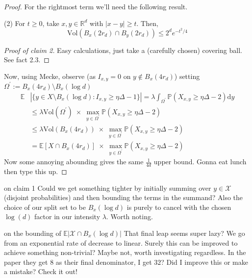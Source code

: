 \documentclass{article}
\begin{document}
\begin{proof}
    For the rightmost term we'll need the following result. 
    \begin{claim}[]{(2)}
        For $t \geq 0$, take $x, y \in \mathbb{R}^d$ with $\lvert x - y \rvert \geq t$. Then,
        \[\text{Vol}(B_x(2r_d)\cap B_y(2r_d)) \leq 2^d e^{-t^2/4}\]
    \end{claim}
    \begin{proof}[Proof of claim 2]
        Easy calculations, just take a (carefully chosen) covering ball. See \cite{campos2023} fact 2.3.
    \end{proof}
    Now, using Mecke, observe (as $I_{x,y} = 0$ on $y \notin B_{x}(4r_d)$) setting $\Omega^\prime 
    := B_x(4r_d) \setminus B_x(\log d)$
    \begin{align*}
        \mathbb{E}&|\{y \in X \setminus B_x(\log d) : I_{x,y} \geq \eta \Delta - 1\}| 
        = \lambda \int_{\Omega^\prime}\mathbb{P}(X_{x,y} \geq \eta \Delta - 2)\mathrm{d}y \\
        &\leq \lambda \text{Vol}(\Omega^\prime) \; \times \;\max_{y \in \Omega^\prime}\mathbb{P}(X_{x,y} \geq \eta \Delta - 2) \\
        &\leq \lambda \text{Vol}(B_x(4r_d)) \; \times \; \max_{y \in \Omega^\prime}\mathbb{P}(X_{x,y} \geq \eta \Delta - 2) \\
        &= \mathbb{E}[X \cap B_x(4r_d)] \; \times \; \max_{y \in \Omega^\prime}\mathbb{P}(X_{x,y} \geq \eta \Delta - 2)
    \end{align*}
    Now some annoying abounding gives the same $\frac{1}{4d}$ upper bound. Gonna eat lunch then type this up.
\end{proof}

\begin{remark}[]{on claim 1}
    Could we get something tighter by initially summing over $y \in \mathcal{X}$ (disjoint probabilities) and 
    then bounding the terms in the summand? Also the choice of our split set to be $B_x(\log d)$ is purely to 
    cancel with the chosen $\log(d)$ factor in our intensity $\lambda$. Worth noting. 
\end{remark}

\begin{remark}[]{on the bounding of $\mathbb{E}|\mathcal{X} \cap B_x(\log d)|$}
    That final leap seems super lazy? We go from an exponential rate of decrease to linear. Surely this can be 
    improved to achieve something non-trivial? Maybe not, worth investigating regardless. In the paper they get 
    $8$ as their final denominator, I get $32$? Did I improve this or make a mistake? Check it out! 
\end{remark}
\end{document}
